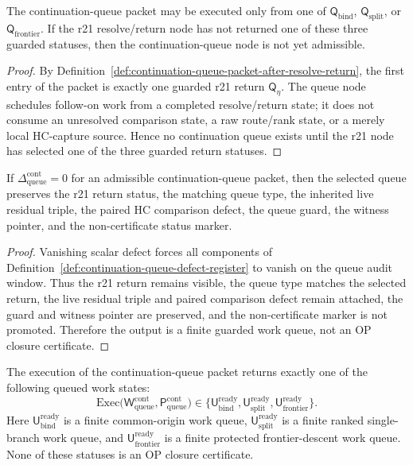 \begin{lemma}
\label{lem:resolve-return-output-is-queue-precondition}
The continuation-queue packet may be executed only from one of \(\mathsf Q_{\mathrm{bind}}\), \(\mathsf Q_{\mathrm{split}}\), or \(\mathsf Q_{\mathrm{frontier}}\).  If the r21 resolve/return node has not returned one of these three guarded statuses, then the continuation-queue node is not yet admissible.
\end{lemma}

\begin{proof}
By Definition~\ref{def:continuation-queue-packet-after-resolve-return}, the first entry of the packet is exactly one guarded r21 return \(\mathsf Q_{\eta}\).  The queue node schedules follow-on work from a completed resolve/return state; it does not consume an unresolved comparison state, a raw route/rank state, or a merely local HC-capture source.  Hence no continuation queue exists until the r21 node has selected one of the three guarded return statuses.
\end{proof}

\begin{lemma}
\label{lem:zero-continuation-queue-defect-preserves-queue-data}
If \(\Delta_{\mathrm{queue}}^{\mathrm{cont}}=0\) for an admissible continuation-queue packet, then the selected queue preserves the r21 return status, the matching queue type, the inherited live residual triple, the paired HC comparison defect, the queue guard, the witness pointer, and the non-certificate status marker.
\end{lemma}

\begin{proof}
Vanishing scalar defect forces all components of Definition~\ref{def:continuation-queue-defect-register} to vanish on the queue audit window.  Thus the r21 return remains visible, the queue type matches the selected return, the live residual triple and paired comparison defect remain attached, the guard and witness pointer are preserved, and the non-certificate marker is not promoted.  Therefore the output is a finite guarded work queue, not an OP closure certificate.
\end{proof}

\begin{definition}
\label{def:r22-continuation-queue-output}
The execution of the continuation-queue packet returns exactly one of the following queued work states:
\[
\mathrm{Exec}\bigl(\mathsf W_{\mathrm{queue}}^{\mathrm{cont}},
                   \mathsf P_{\mathrm{queue}}^{\mathrm{cont}}\bigr)
\in
\{\mathsf U_{\mathrm{bind}}^{\mathrm{ready}},
  \mathsf U_{\mathrm{split}}^{\mathrm{ready}},
  \mathsf U_{\mathrm{frontier}}^{\mathrm{ready}}\}.
\]
Here \(\mathsf U_{\mathrm{bind}}^{\mathrm{ready}}\) is a finite common-origin work queue, \(\mathsf U_{\mathrm{split}}^{\mathrm{ready}}\) is a finite ranked single-branch work queue, and \(\mathsf U_{\mathrm{frontier}}^{\mathrm{ready}}\) is a finite protected frontier-descent work queue.  None of these statuses is an OP closure certificate.
\end{definition}

